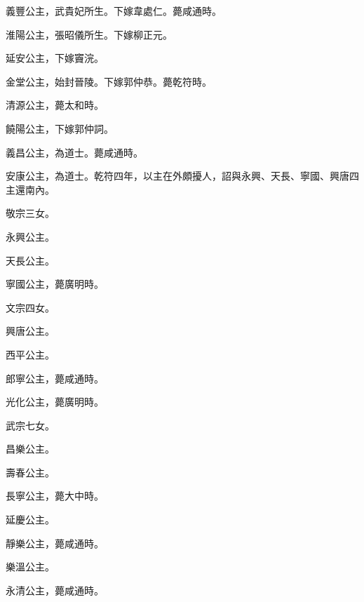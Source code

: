 \begin{pinyinscope}
 義豐公主，武貴妃所生。下嫁韋處仁。薨咸通時。



 淮陽公主，張昭儀所生。下嫁柳正元。



 延安公主，下嫁竇浣。



 金堂公主，始封晉陵。下嫁郭仲恭。薨乾符時。



 清源公主，薨太和時。



 饒陽公主，下嫁郭仲詞。



 義昌公主，為道士。薨咸通時。



 安康公主，為道士。乾符四年，以主在外頗擾人，詔與永興、天長、寧國、興唐四主還南內。



 敬宗三女。



 永興公主。



 天長公主。



 寧國公主，薨廣明時。



 文宗四女。



 興唐公主。



 西平公主。



 郎寧公主，薨咸通時。



 光化公主，薨廣明時。



 武宗七女。



 昌樂公主。



 壽春公主。



 長寧公主，薨大中時。



 延慶公主。



 靜樂公主，薨咸通時。



 樂溫公主。



 永清公主，薨咸通時。




\end{pinyinscope}
